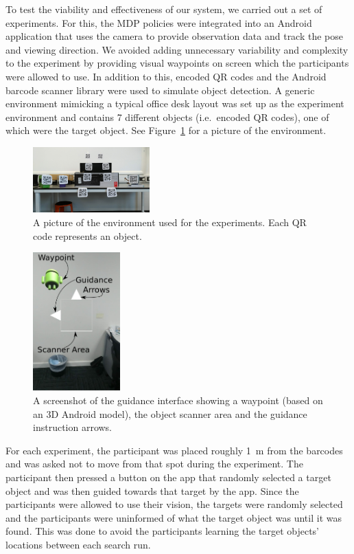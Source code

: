 \documentclass[a4paper, twoside]{article}
\begin{document}
\noindent To test the viability and effectiveness of our system, we carried out a set of experiments. For this, the MDP policies were integrated into an Android application that uses the camera to provide observation data and track the pose and viewing direction. We avoided adding unnecessary variability and complexity to the experiment by providing visual waypoints on screen which the participants were allowed to use. In addition to this, encoded QR codes and the Android barcode scanner library were used to simulate object detection. A generic environment mimicking a typical office desk layout was set up as the experiment environment and contains 7 different objects (i.e.\ encoded QR codes), one of which were the target object. See Figure~\ref{fig:env-picture} for a picture of the environment. 

\begin{figure}
  \centering
  \includegraphics[width=0.4\textwidth]{figures/test_env_picture.jpg}
  \caption{A picture of the environment used for the experiments. Each QR code represents an object. }\label{fig:env-picture}
\end{figure}

\begin{figure}
  \centering
  \includegraphics[width=0.3\textwidth]{figures/system_screenshot.png}
  \caption{A screenshot of the guidance interface showing a waypoint (based on an 3D Android model), the object scanner area and the guidance instruction arrows. }\label{fig:system-screenshot}
\end{figure}

For each experiment, the participant was placed roughly \SI{1}{\meter} from the barcodes and was asked not to move from that spot during the experiment. The participant then pressed a button on the app that randomly selected a target object and was then guided towards that target by the app. Since the participants were allowed to use their vision, the targets were randomly selected and the participants were uninformed of what the target object was until it was found. This was done to avoid the participants learning the target objects' locations between each search run.
\end{document}
